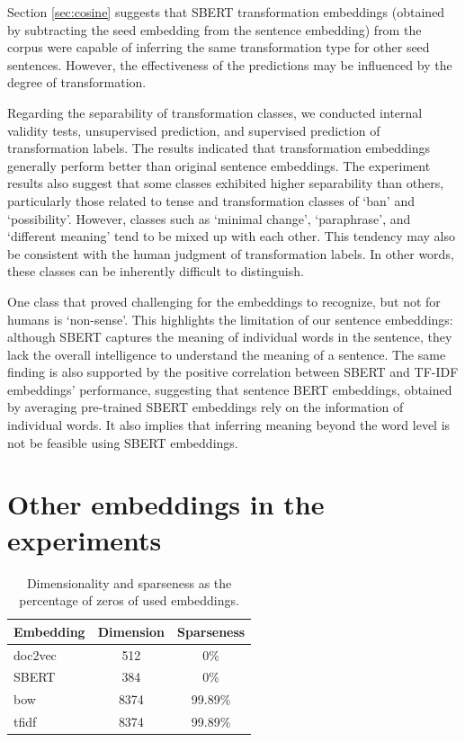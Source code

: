 \documentclass[11pt]{article}
\begin{document}
Section \ref{sec:cosine} suggests that SBERT transformation embeddings (obtained by subtracting the seed embedding from the sentence embedding) from the corpus were capable of inferring the same transformation type for other seed sentences. However, the effectiveness of the predictions may be influenced by the degree of transformation. 

Regarding the separability of transformation classes, we conducted internal validity tests, unsupervised prediction, and supervised prediction of transformation labels. The results indicated that transformation embeddings generally perform better than original sentence embeddings. The experiment results also suggest that some classes exhibited higher separability than others, particularly those related to tense and transformation classes of `ban' and `possibility'. However, classes such as `minimal change', `paraphrase', and `different meaning' tend to be mixed up with each other. This tendency may also be consistent with the human judgment of transformation labels. In other words, these classes can be inherently difficult to distinguish.

One class that proved challenging for the embeddings to recognize, but not for humans is `non-sense'. This highlights the limitation of our sentence embeddings: although SBERT captures the meaning of individual words in the sentence, they lack the overall intelligence to understand the meaning of a sentence. The same finding is also supported by the positive correlation between SBERT and TF-IDF embeddings' performance, suggesting that sentence BERT embeddings, obtained by averaging pre-trained SBERT embeddings rely on the information of individual words. It also implies that inferring meaning beyond the word level is not be feasible using SBERT embeddings.






\clearpage
\appendix
\section{Other embeddings in the experiments}
\begin{table}[htp]
  \centering
  \begin{tabular}{l  c c}
    \toprule
    Embedding & Dimension & Sparseness\\
    \midrule
     doc2vec & 512 & 0\%\\
     SBERT & 384 & 0\%\\
     {bow} & 8374 & 99.89\%\\
     {tfidf} & 8374 & 99.89\%\\
    \bottomrule
  \end{tabular}
  \caption{Dimensionality and sparseness as the percentage of zeros of used
  embeddings.}\label{tab:embeddings_dim}
\end{table}
\end{document}
